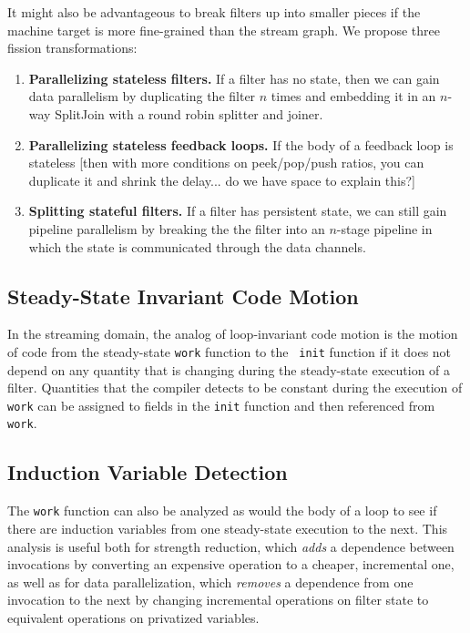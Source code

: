It might also be advantageous to break filters up into smaller pieces if
the machine target is more fine-grained than the stream graph.  We
propose three fission transformations:
\begin{enumerate}
\item {\bf Parallelizing stateless filters.}  If a filter has no state,
  then we can gain data parallelism by duplicating the filter $n$ times
  and embedding it in an $n$-way SplitJoin with a round robin splitter
  and joiner.
\item {\bf Parallelizing stateless feedback loops.}  If the body of a
  feedback loop is stateless [then with more conditions on peek/pop/push
  ratios, you can duplicate it and shrink the delay... do we have space
  to explain this?]
\item {\bf Splitting stateful filters.}  If a filter has persistent
  state, we can still gain pipeline parallelism by breaking the the
  filter into an $n$-stage pipeline in which the state is communicated
  through the data channels.
\end{enumerate}

\subsection{Steady-State Invariant Code Motion}

In the streaming domain, the analog of loop-invariant code motion is the
motion of code from the steady-state {\tt work} function to the {\tt
init} function if it does not depend on any quantity that is changing
during the steady-state execution of a filter.  Quantities that the
compiler detects to be constant during the execution of {\tt work} can
be assigned to fields in the {\tt init} function and then referenced
from {\tt work}.

\subsection{Induction Variable Detection}

The {\tt work} function can also be analyzed as would the body of a loop
to see if there are induction variables from one steady-state execution
to the next.  This analysis is useful both for strength reduction, which
{\it adds} a dependence between invocations by converting an expensive
operation to a cheaper, incremental one, as well as for data
parallelization, which {\it removes} a dependence from one invocation to
the next by changing incremental operations on filter state to
equivalent operations on privatized variables.

